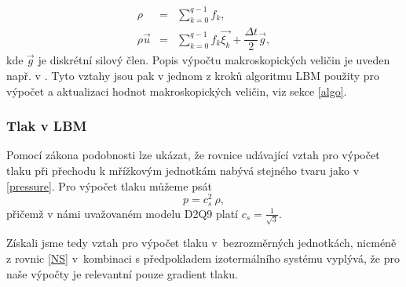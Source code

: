 \begin{subequations}\label{macroeq}
	\begin{eqnarray}
	\label{rho}
	\rho &=& \sum_{k=0}^{q-1} f_{k},\\[3pt]
	\rho \vec{u} &=& \sum_{k=0}^{q-1} f_{k} \vec{\xi_{k}} + \dfrac{\Delta t}{2} \vec{g},
	\end{eqnarray}
\end{subequations}
kde $\vec{g}$ je diskrétní silový člen. Popis výpočtu makroskopických veličin je uveden např. v \cite{Kruger}. Tyto vztahy jsou pak v jednom z kroků algoritmu LBM použity pro výpočet a aktualizaci hodnot makroskopických veličin, viz sekce \ref{algo}.
\subsubsection{Tlak v LBM}\label{pressureLBM}
Pomocí zákona podobnosti lze ukázat, že rovnice udávající vztah pro výpočet tlaku při přechodu k mřížkovým jednotkám nabývá stejného tvaru jako v \eqref{pressure}. Pro výpočet tlaku můžeme psát
\begin{equation}\label{tlakLBM}
p = c^2_{s}\ \rho,
\end{equation}
přičemž v námi uvažovaném modelu D2Q9 platí $ c_{s} = \frac{1}{\sqrt{3}}$.

Získali jsme tedy vztah pro výpočet tlaku v~bezrozměrných jednotkách, nicméně z rovnic \eqref{NS} v~kombinaci s předpokladem izotermálního systému vyplývá, že pro naše výpočty je relevantní pouze gradient tlaku.

